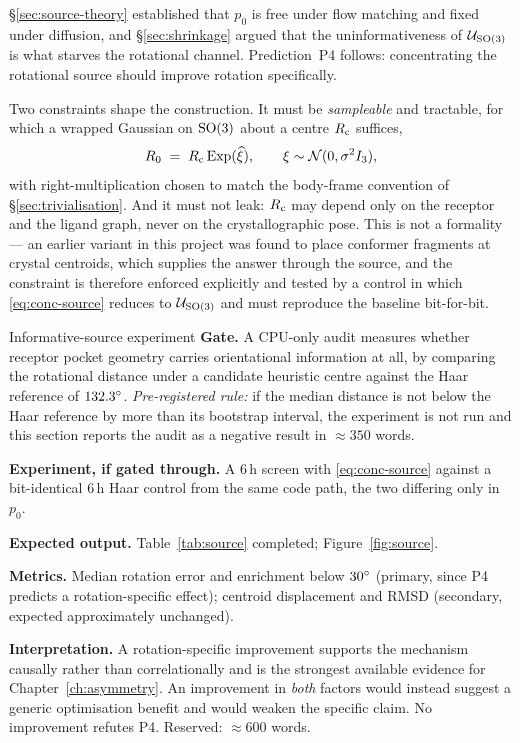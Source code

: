 \S\ref{sec:source-theory} established that $p_0$ is free under flow matching
and fixed under diffusion, and \S\ref{sec:shrinkage} argued that the
uninformativeness of $\mathcal{U}_{\mathrm{SO}(3)}$ is what starves the rotational channel.
Prediction~P4 follows: concentrating the rotational source should improve
rotation specifically.

Two constraints shape the construction. It must be \emph{sampleable} and
tractable, for which a wrapped Gaussian on $\mathrm{SO}(3)$ about a centre
$R_{\mathrm{c}}$ suffices,
\begin{equation}
  R_0 \;=\; R_{\mathrm{c}} \operatorname{Exp}(\widehat{\xi}),
  \qquad \xi \sim \mathcal{N}(0, \sigma^2 I_3),
  \label{eq:conc-source}
\end{equation}
with right-multiplication chosen to match the body-frame convention of
\S\ref{sec:trivialisation}. And it must not leak: $R_{\mathrm{c}}$ may
depend only on the receptor and the ligand graph, never on the crystallographic
pose. This is not a formality --- an earlier variant in this project was found
to place conformer fragments at crystal centroids, which supplies the answer
through the source, and the constraint is therefore enforced explicitly and
tested by a control in which \eqref{eq:conc-source} reduces to $\mathcal{U}_{\mathrm{SO}(3)}$ and
must reproduce the baseline bit-for-bit.

\begin{reserved}{Informative-source experiment}
\textbf{Gate.} A CPU-only audit measures whether receptor pocket geometry
carries orientational information at all, by comparing the rotational distance
under a candidate heuristic centre against the Haar reference of
$132.3^{\circ}$. \emph{Pre-registered rule:} if the median distance is not below
the Haar reference by more than its bootstrap interval, the experiment is not
run and this section reports the audit as a negative result in
\(\approx 350\) words.

\textbf{Experiment, if gated through.} A $6$\,h screen with
\eqref{eq:conc-source} against a bit-identical $6$\,h Haar control from the
same code path, the two differing only in $p_0$.

\textbf{Expected output.} Table~\ref{tab:source} completed;
Figure~\ref{fig:source}.

\textbf{Metrics.} Median rotation error and enrichment below $30^{\circ}$
(primary, since P4 predicts a rotation-specific effect); centroid displacement
and RMSD (secondary, expected approximately unchanged).

\textbf{Interpretation.} A rotation-specific improvement supports the
mechanism causally rather than correlationally and is the strongest available
evidence for Chapter~\ref{ch:asymmetry}. An improvement in \emph{both} factors
would instead suggest a generic optimisation benefit and would weaken the
specific claim. No improvement refutes P4.
Reserved: \(\approx 600\) words.
\end{reserved}

